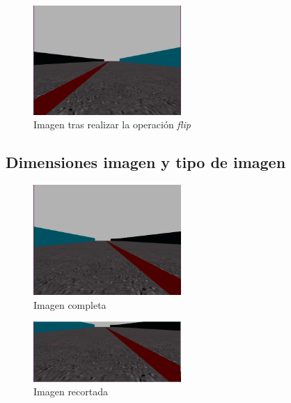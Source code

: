 \begin{figure}
\begin{center}
	\includegraphics[width=0.5\textwidth]{figures/Regresion/img_flip.png}
   \caption{Imagen tras realizar la operación \textit{flip}}
	\label{fig.image_flip}
\end{center}
\end{figure}


\subsection{Dimensiones imagen y tipo de imagen}

\begin{figure}
\begin{center}
	\includegraphics[width=0.5\textwidth]{figures/Regresion/img_normal.png}
   \caption{Imagen completa}
	\label{fig.completa_reg}
\end{center}
\end{figure}

\begin{figure}
\begin{center}
	\includegraphics[width=0.5\textwidth]{figures/Regresion/img_cropped_reg.png}
   \caption{Imagen recortada}
	\label{fig.recortada_reg}
\end{center}
\end{figure}

